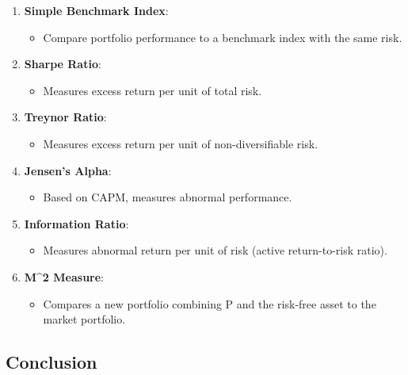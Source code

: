 \documentclass[
]{book}
\providecommand{\tightlist}{%
  \setlength{\itemsep}{0pt}\setlength{\parskip}{0pt}}
\begin{document}
\begin{enumerate}
\def\labelenumi{\arabic{enumi}.}
\tightlist
\item
  \textbf{Simple Benchmark Index}:

  \begin{itemize}
  \tightlist
  \item
    Compare portfolio performance to a benchmark index with the same risk.
  \end{itemize}
\item
  \textbf{Sharpe Ratio}:

  \begin{itemize}
  \tightlist
  \item
    Measures excess return per unit of total risk.
  \end{itemize}
\item
  \textbf{Treynor Ratio}:

  \begin{itemize}
  \tightlist
  \item
    Measures excess return per unit of non-diversifiable risk.
  \end{itemize}
\item
  \textbf{Jensen's Alpha}:

  \begin{itemize}
  \tightlist
  \item
    Based on CAPM, measures abnormal performance.
  \end{itemize}
\item
  \textbf{Information Ratio}:

  \begin{itemize}
  \tightlist
  \item
    Measures abnormal return per unit of risk (active return-to-risk ratio).
  \end{itemize}
\item
  \textbf{M\^{}2 Measure}:

  \begin{itemize}
  \tightlist
  \item
    Compares a new portfolio combining P and the risk-free asset to the market portfolio.
  \end{itemize}
\end{enumerate}

\hypertarget{conclusion-1}{%
\subsection{Conclusion}\label{conclusion-1}}
\end{document}
